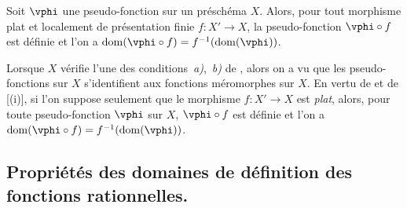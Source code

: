 \begin{corollary}[20.3.12]
\label{IV.20.3.12}
Soit $\vphi$ une pseudo-fonction sur un préschéma $X$.
Alors, pour tout morphisme plat et localement de présentation finie $f:X'\to X$, la pseudo-fonction $\vphi\circ f$ est définie et l'on a $\operatorname{dom}(\vphi\circ f)=f^{-1}(\operatorname{dom}(\vphi))$.
\end{corollary}

\begin{remark}[20.3.13]
\label{IV.20.3.13}
Lorsque $X$ vérifie l'une des conditions~\emph{a)},~\emph{b)} de , alors on a vu  que les pseudo-fonctions sur $X$ s'identifient aux fonctions méromorphes sur $X$.
En vertu de  et de [(i)], si l'on suppose seulement que le morphisme $f:X'\to X$ est \emph{plat}, alors, pour toute pseudo-fonction $\vphi$ sur $X$, $\vphi\circ f$ est définie et l'on a $\operatorname{dom}(\vphi\circ f)=f^{-1}(\operatorname{dom}(\vphi))$.
\end{remark}

\subsection{Propriétés des domaines de définition des fonctions rationnelles.}

